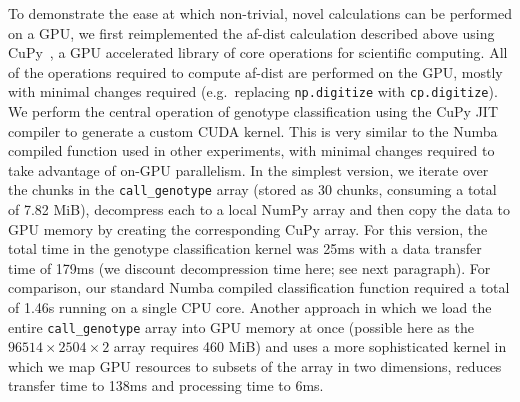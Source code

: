 \documentclass[a4paper,num-refs]{oup-contemporary}
\begin{document}
To demonstrate the ease at which non-trivial, novel calculations 
can be performed on a GPU,
we first reimplemented the af-dist calculation
described above using CuPy~\citep{okuta2017cupy}, a GPU accelerated library
of core operations for scientific computing.
All of the operations required to compute  af-dist are
performed on the GPU, mostly with minimal changes required
(e.g.\ replacing \texttt{np.digitize} with \texttt{cp.digitize}).
We perform the central operation of genotype classification using the
CuPy JIT compiler to generate a custom CUDA kernel. 
This is very similar to the Numba compiled function used in other
experiments, with minimal changes required to take advantage of
on-GPU parallelism. In the simplest version, we iterate over the chunks
in the \texttt{call\_genotype} array (stored as 30 chunks, consuming
a total of 7.82 MiB), decompress each to a local
NumPy array and then copy the data to GPU memory by creating
the corresponding CuPy array. For this version, the total time
in the genotype classification kernel was 25ms with a
data transfer time of 179ms (we discount decompression
time here; see next paragraph). For comparison,
our standard Numba compiled classification function required
a total of 1.46s running on a single CPU core.
Another approach in which we load the entire
\texttt{call\_genotype} array into GPU memory at once (possible
here as the $96514 \times 2504 \times 2$ array requires
460 MiB) and uses
a more sophisticated kernel in which we map GPU resources to
subsets of the array in two dimensions,
reduces transfer time to 138ms and processing time to 6ms.
\end{document}
